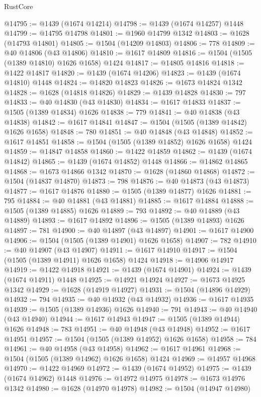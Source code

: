 \begin{lexlean}{RustCore}
\begin{coremodule}
@14795 := @1439 (@1674 @14214)
@14798 := @1439 (@1674 @14257) @1448
@14799 := @14795 @14798
@14801 := @1960 @14799 @1342
@14803 := @1628 (@14793 @14801)
@14805 := @1504 (@14209 @14803)
@14806 := 778
@14809 := @40 @14806 (@43 @14806)
@14810 := @1617 @14809
@14816 := @1504 (@1505 (@1389 @14810) @1626 @1658) @1424
@14817 := @14805 @14816
@14818 := @1422 @14817
@14820 := @1439 (@1674 @14206)
@14823 := @1439 (@1674 @14810) @1448
@14824 := @14820 @14823
@14826 := @1673 @14824 @1342
@14828 := @1628 (@14818 @14826)
@14829 := @1439 @14828
@14830 := 797
@14833 := @40 @14830 (@43 @14830)
@14834 := @1617 @14833
@14837 := @1505 (@1389 @14834) @1626
@14838 := 779
@14841 := @40 @14838 (@43 @14838)
@14842 := @1617 @14841
@14847 := @1504 (@1505 (@1389 @14842) @1626 @1658)
@14848 := 780
@14851 := @40 @14848 (@43 @14848)
@14852 := @1617 @14851
@14858 := @1504 (@1505 (@1389 @14852) @1626 @1658) @1424
@14859 := @14847 @14858
@14860 := @1422 @14859
@14862 := @1439 (@1674 @14842)
@14865 := @1439 (@1674 @14852) @1448
@14866 := @14862 @14865
@14868 := @1673 @14866 @1342
@14870 := @1628 (@14860 @14868)
@14872 := @1504 (@14837 @14870)
@14873 := 798
@14876 := @40 @14873 (@43 @14873)
@14877 := @1617 @14876
@14880 := @1505 (@1389 @14877) @1626
@14881 := 795
@14884 := @40 @14881 (@43 @14881)
@14885 := @1617 @14884
@14888 := @1505 (@1389 @14885) @1626
@14889 := 793
@14892 := @40 @14889 (@43 @14889)
@14893 := @1617 @14892
@14896 := @1505 (@1389 @14893) @1626
@14897 := 781
@14900 := @40 @14897 (@43 @14897)
@14901 := @1617 @14900
@14906 := @1504 (@1505 (@1389 @14901) @1626 @1658)
@14907 := 782
@14910 := @40 @14907 (@43 @14907)
@14911 := @1617 @14910
@14917 := @1504 (@1505 (@1389 @14911) @1626 @1658) @1424
@14918 := @14906 @14917
@14919 := @1422 @14918
@14921 := @1439 (@1674 @14901)
@14924 := @1439 (@1674 @14911) @1448
@14925 := @14921 @14924
@14927 := @1673 @14925 @1342
@14929 := @1628 (@14919 @14927)
@14931 := @1504 (@14896 @14929)
@14932 := 794
@14935 := @40 @14932 (@43 @14932)
@14936 := @1617 @14935
@14939 := @1505 (@1389 @14936) @1626
@14940 := 791
@14943 := @40 @14940 (@43 @14940)
@14944 := @1617 @14943
@14947 := @1505 (@1389 @14944) @1626
@14948 := 783
@14951 := @40 @14948 (@43 @14948)
@14952 := @1617 @14951
@14957 := @1504 (@1505 (@1389 @14952) @1626 @1658)
@14958 := 784
@14961 := @40 @14958 (@43 @14958)
@14962 := @1617 @14961
@14968 := @1504 (@1505 (@1389 @14962) @1626 @1658) @1424
@14969 := @14957 @14968
@14970 := @1422 @14969
@14972 := @1439 (@1674 @14952)
@14975 := @1439 (@1674 @14962) @1448
@14976 := @14972 @14975
@14978 := @1673 @14976 @1342
@14980 := @1628 (@14970 @14978)
@14982 := @1504 (@14947 @14980)

\end{coremodule}
\end{lexlean}
